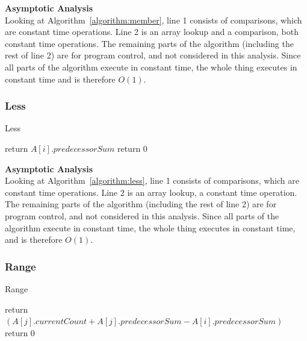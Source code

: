 \documentclass[10pt]{article}
\begin{document}
\textbf{Asymptotic Analysis}\\
Looking at Algorithm~\ref{algorithm:member}, line 1 consists of comparisons, which are constant time operations.
Line 2 is an array lookup and a comparison, both constant time operations.
The remaining parts of the algorithm (including the rest of line 2) are for program control, and not considered in this analysis. Since all parts of the algorithm execute in constant time, the whole thing executes in constant time and is therefore $O(1)$.

\subsubsection{Less}

\begin{algorithm}[H]
    \SetAlgoLined
    \caption{Less}
    \label{algorithm:less}
     
     {
        return $A[i].predecessorSum$\;
    } {
        return 0\;
   }
\end{algorithm}

\textbf{Asymptotic Analysis}\\
Looking at Algorithm~\ref{algorithm:less}, line 1 consists of comparisons, which are constant time operations.
Line 2 is an array lookup, a constant time operation.
The remaining parts of the algorithm (including the rest of line 2) are for program control, and not considered in this analysis. Since all parts of the algorithm execute in constant time, the whole thing executes in constant time, and is therefore $O(1)$.

\subsubsection{Range}

\begin{algorithm}[H]
    \SetAlgoLined
    \caption{Range}
    \label{algorithm:range}
     
     {
        return $(A[j].currentCount + A[j].predecessorSum - A[i].predecessorSum)$\;
    } {
        return 0\;
   }
\end{algorithm}
\end{document}
